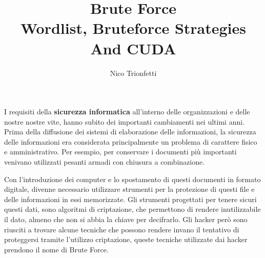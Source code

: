 \documentclass[a4paper]{unicam_thesis}
\title{Brute Force \\ Wordlist, Bruteforce Strategies And CUDA }
\author{Nico Trionfetti}%
\theoremstyle{definition} \newtheorem{esempio}{Esempio}[chapter]
\theoremstyle{definition}
\begin{document}
\maketitle


\tableofcontents

\abstract

I requisiti della \textbf{sicurezza informatica} all'interno delle organizzazioni e delle nostre nostre vite, hanno subito dei importanti cambiamenti nei ultimi anni. Prima della diffusione dei sistemi di elaborazione delle informazioni, la sicurezza delle informazioni era considerata principalmente un problema di carattere fisico e amministrativo. Per esempio, per conservare i documenti più importanti venivano utilizzati pesanti armadi con chiusura a combinazione.

Con l'introduzione dei computer e lo spostamento di questi documenti in formato digitale, divenne necessario utilizzare strumenti per la protezione di questi file e delle informazioni in essi memorizzate. Gli strumenti progettati per tenere sicuri questi dati, sono algoritmi di criptazione, che permettono di rendere inutilizzabile il dato, almeno che non si abbia la chiave per decifrarlo. Gli hacker però sono riusciti a trovare alcune tecniche che possono rendere invano il tentativo di proteggersi tramite l'utilizzo criptazione, queste tecniche utilizzate dai hacker prendono il nome di Brute Force. 











\lstlistoflistings
\listoffigures
\listoftables

\appendix
%
%
%

\printbibliography

\printindex


\end{document}
